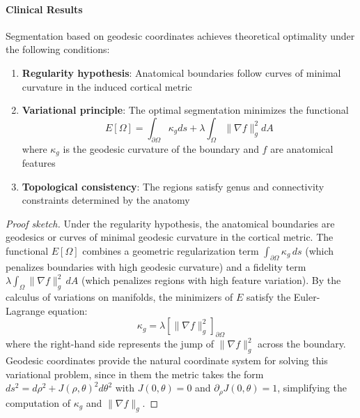 \paragraph{Clinical Results}

\begin{proposition}\label{prop:optimalidad_segmentacion}
Segmentation based on geodesic coordinates achieves theoretical optimality under the following conditions:

\begin{enumerate}
    \item \textbf{Regularity hypothesis}: Anatomical boundaries follow curves of minimal curvature in the induced cortical metric
    \item \textbf{Variational principle}: The optimal segmentation minimizes the functional
    \begin{equation}
    E[\Omega] = \int_{\partial \Omega} \kappa_g ds + \lambda \int_{\Omega} \|\nabla f\|_g^2 dA
    \end{equation}
    where $\kappa_g$ is the geodesic curvature of the boundary and $f$ are anatomical features
    \item \textbf{Topological consistency}: The regions satisfy genus and connectivity constraints determined by the anatomy
\end{enumerate}
\end{proposition}

\begin{proof}[Proof sketch]
Under the regularity hypothesis, the anatomical boundaries are geodesics or curves of minimal geodesic curvature in the cortical metric. The functional $E[\Omega]$ combines a geometric regularization term $\int_{\partial \Omega} \kappa_g \, ds$ (which penalizes boundaries with high geodesic curvature) and a fidelity term $\lambda \int_{\Omega} \|\nabla f\|_g^2 \, dA$ (which penalizes regions with high feature variation). By the calculus of variations on manifolds, the minimizers of $E$ satisfy the Euler-Lagrange equation:
\[
\kappa_g = \lambda \left[\|\nabla f\|_g^2\right]_{\partial \Omega}
\]
where the right-hand side represents the jump of $\|\nabla f\|_g^2$ across the boundary. Geodesic coordinates provide the natural coordinate system for solving this variational problem, since in them the metric takes the form $ds^2 = d\rho^2 + J(\rho, \theta)^2 d\theta^2$ with $J(0, \theta) = 0$ and $\partial_\rho J(0,\theta) = 1$, simplifying the computation of $\kappa_g$ and $\|\nabla f\|_g$.
\end{proof}

